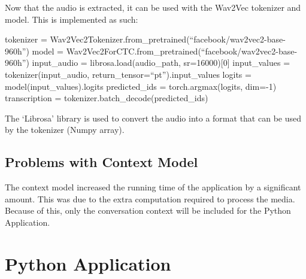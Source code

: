 Now that the audio is extracted, it can be used with the Wav2Vec tokenizer and model. This is implemented as such:
\begin{algorithm}
    \begin{algorithmic}
        \STATE tokenizer = Wav2Vec2Tokenizer.from\_pretrained(``facebook/wav2vec2-base-960h'')
        \STATE model = Wav2Vec2ForCTC.from\_pretrained(``facebook/wav2vec2-base-960h'')
        \STATE input\_audio = librosa.load(audio\_path, sr=16000)[0]
        \STATE input\_values = tokenizer(input\_audio, return\_tensor=``pt'').input\_values
        \STATE logits = model(input\_values).logits
        \STATE predicted\_ids = torch.argmax(logits, dim=-1)
        \STATE transcription = tokenizer.batch\_decode(predicted\_ids)
    \end{algorithmic}
\end{algorithm}

The `Librosa' library is used to convert the audio into a format that can be used by the tokenizer (Numpy array).
\subsection{Problems with Context Model}
The context model increased the running time of the application by a significant amount. This was due to the extra computation required to process the media.
Because of this, only the conversation context will be included for the Python Application.
\section{Python Application}
